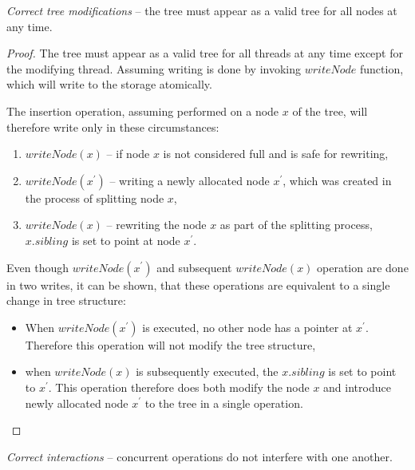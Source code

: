 \begin{theorem}\label{theorem:b-link-tree:modifications}
  \textit{Correct tree modifications} -- the tree must appear as a valid tree for all nodes at any time.
\end{theorem}

\begin{proof}
  The tree must appear as a valid tree for all threads at any time except for the modifying thread. Assuming writing is done by invoking $writeNode$ function, which will write to the storage atomically.

  The insertion operation, assuming performed on a node $x$ of the tree, will therefore write only in these circumstances:

  \begin{enumerate}
    \item $writeNode(x)$ -- if node $x$ is not considered full and is safe for rewriting,
    \item $writeNode(x^\prime)$ -- writing a newly allocated node $x^\prime$, which was created in the process of splitting node $x$,
    \item $writeNode(x)$ -- rewriting the node $x$ as part of the splitting process, $x.sibling$ is set to point at node $x^\prime$.
  \end{enumerate}

  Even though $writeNode(x^\prime)$ and subsequent $writeNode(x)$ operation are done in two writes, it can be shown, that these operations are equivalent to a single change in tree structure:

  \begin{itemize}
    \item When $writeNode(x^\prime)$ is executed, no other node has a pointer at $x^\prime$. Therefore this operation will not modify the tree structure,
    \item when $writeNode(x)$ is subsequently executed, the $x.sibling$ is set to point to $x^\prime$. This operation therefore does both modify the node $x$ and introduce newly allocated node $x^\prime$ to the tree in a single operation.
  \end{itemize}
\end{proof}

\begin{theorem}
  \textit{Correct interactions} -- concurrent operations do not interfere with one another.
\end{theorem}

